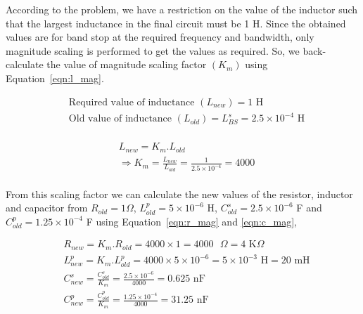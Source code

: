 \documentclass{lab_sheet}
\begin{document}
According to the problem, we have a restriction on the value of the inductor such that the largest inductance in the final circuit must be 1 H. Since the obtained values are for band stop at the required frequency and bandwidth, only magnitude scaling is performed to get the values as required. So, we back-calculate the value of magnitude scaling factor $(K_m)$ using Equation~\ref{eqn:l_mag}.

\begin{fleqn}[\parindent]
   \begin{equation*}
      \begin{split}
         &\text{Required value of inductance } (L_{new})=1 \text{ H}\\
         &\text{Old value of inductance }(L_{old})=L_{BS}^s=2.5\times10^{-4} \text{ H} \\
      \end{split}
      \end{equation*}
\end{fleqn}
\begin{fleqn}[\parindent]
   \begin{equation*}
      \begin{split}
         &L_{new}=K_m.L_{old}\\
         &\Rightarrow K_m = \frac{L_{new}}{L_{old}} = \frac{1}{2.5\times10^{-4}}=4000\\
      \end{split}
      \end{equation*}
\end{fleqn}

From this scaling factor we can calculate the new values of the resistor, inductor and capacitor from $R_{old}=1\Omega$, $L_{old}^p=5\times10^{-6}$ H, $C_{old}^s=2.5\times10^{-6}$ F and $C_{old}^p=1.25\times10^{-4}$ F using Equation~\ref{eqn:r_mag} and \ref{eqn:c_mag},
\begin{fleqn}[\parindent]
   \begin{equation*}
      \begin{split}
         &R_{new}=K_m.R_{old}=4000\times1=4000 \text{ }\Omega=4\text{ K}\Omega\\
         &L_{new}^p=K_m.L_{old}^p=4000\times5\times10^{-6}=5\times10^{-3} \text{ H}=20\text{ mH}\\
         &C_{new}^s=\frac{C_{old}^s}{K_m}=\frac{2.5\times10^{-6}}{4000}=0.625 \text{ nF}\\
         &C_{new}^p=\frac{C_{old}^p}{K_m}=\frac{1.25\times10^{-4}}{4000}=31.25 \text{ nF}\\
      \end{split}
      \end{equation*}
\end{fleqn}
\end{document}
